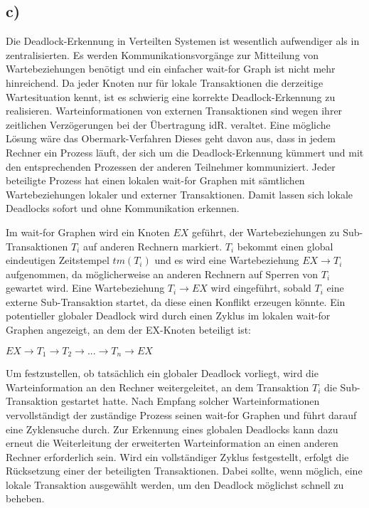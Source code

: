 \documentclass[ngerman]{fbi-aufgabenblatt}
\begin{document}
\setcounter{section}{1}

\subsection*{c)}
Die Deadlock-Erkennung in Verteilten Systemen ist wesentlich aufwendiger als in zentralisierten. Es werden Kommunikationsvorgänge zur Mitteilung von Wartebeziehungen benötigt und ein einfacher wait-for Graph ist nicht mehr hinreichend.
 Da jeder Knoten nur für lokale Transaktionen die derzeitige Wartesituation kennt, ist es schwierig eine korrekte Deadlock-Erkennung zu realisieren. Warteinformationen von externen Transaktionen sind wegen ihrer zeitlichen Verzögerungen bei der Übertragung idR. veraltet. 
Eine mögliche Lösung wäre das Obermark-Verfahren
Dieses geht davon aus, dass in jedem Rechner ein Prozess läuft, der sich um die Deadlock-Erkennung kümmert und mit den entsprechenden Prozessen der anderen Teilnehmer kommuniziert. Jeder beteiligte Prozess hat einen lokalen wait-for Graphen mit sämtlichen Wartebeziehungen lokaler und externer Transaktionen. Damit lassen sich lokale Deadlocks sofort und ohne Kommunikation erkennen. 

Im wait-for Graphen wird ein Knoten $EX$ geführt, der Wartebeziehungen zu Sub-Transaktionen $T_{i}$ auf anderen Rechnern markiert. $T_{i}$ bekommt einen global eindeutigen Zeitstempel $tm(T_{i})$ und es wird 
eine Wartebeziehung $EX \rightarrow T_{i}$ aufgenommen, da möglicherweise an anderen Rechnern auf Sperren von $T_{i}$ gewartet wird. Eine Wartebeziehung $T_{i} \rightarrow EX$ wird eingeführt, sobald $T_{i}$ eine externe Sub-Transaktion startet, da diese einen Konflikt erzeugen könnte. Ein potentieller globaler Deadlock wird durch einen Zyklus im lokalen wait-for Graphen angezeigt, an dem der EX-Knoten beteiligt ist:

$EX \rightarrow T_{1} \rightarrow T_{2} \rightarrow ... \rightarrow T_{n} \rightarrow EX$

Um festzustellen, ob tatsächlich ein globaler Deadlock vorliegt, wird die Warteinformation an den Rechner weitergeleitet, an dem Transaktion $T_{i}$ die Sub-Transaktion gestartet hatte. Nach Empfang solcher Warteinformationen vervollständigt der zuständige Prozess seinen wait-for Graphen und führt darauf eine Zyklensuche durch. Zur Erkennung eines globalen Deadlocks kann dazu erneut die Weiterleitung der erweiterten Warteinformation an einen anderen Rechner erforderlich sein. Wird ein vollständiger Zyklus festgestellt, erfolgt die Rücksetzung einer der beteiligten Transaktionen. Dabei sollte, wenn möglich, eine lokale Transaktion ausgewählt werden, um den Deadlock möglichst schnell zu beheben.
\end{document}
